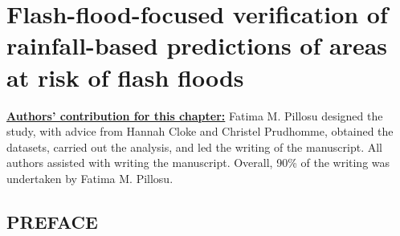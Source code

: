 \ClearShipoutPicture
{}

\chapter{Flash-flood-focused verification of rainfall-based 
predictions of areas at risk of flash floods}
\label{flash_flood_focused_verification_rainfall_based_ff}
\graphicspath{{chapter_05/figures}{chapter_05/tables}}

\underline{\textbf{Authors' contribution for this chapter:}} Fatima M. Pillosu designed the study, with advice from Hannah Cloke and Christel Prudhomme, obtained the datasets, carried out the analysis, and led the writing of the manuscript. All authors assisted with writing the manuscript. Overall, 90\% of the writing was undertaken by Fatima M. Pillosu.

\vspace{\baselineskip}

\section*{PREFACE}

